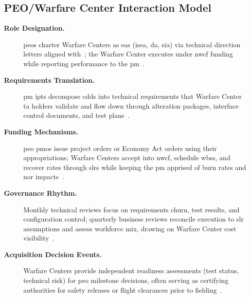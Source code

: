 \documentclass[../main.tex]{subfiles}
\begin{document}
\begin{refsegment}
\subsection{PEO/Warfare Center Interaction Model}
\begin{description}
	\item[\textbf{Role Designation.}] \acp{peo} charter Warfare Centers as \acp{ea} (\ac{isea}, \ac{da}, \ac{sia}) via technical direction letters aligned with~\autocite{SECNAV5400-15D}; the Warfare Center executes under \ac{nwcf} funding while reporting performance to the \ac{pm}~\autocite{edo-2-1-4-warfare-centers-2024}.
	\item[\textbf{Requirements Translation.}] \ac{pm} \acp{ipt} decompose \acp{cdd} into technical requirements that Warfare Center \ac{ta} holders validate and flow down through alteration packages, interface control documents, and test plans~\autocite{edo-2-1-4-warfare-centers-2024}.
	\item[\textbf{Funding Mechanisms.}] \ac{peo} \acp{pmo} issue project orders or Economy Act orders using their appropriations; Warfare Centers accept into \ac{nwcf}, schedule \acp{wbs}, and recover rates through \acp{slr} while keeping the \ac{pm} apprised of burn rates and \ac{nor} impacts~\autocite{edo-3-1-5-field-activity-fm-2025}.
	\item[\textbf{Governance Rhythm.}] Monthly technical reviews focus on requirements churn, test results, and configuration control; quarterly business reviews reconcile execution to \ac{slr} assumptions and assess workforce mix, drawing on Warfare Center cost visibility~\autocite{SECNAV5400-15D,edo-3-1-5-field-activity-fm-2025}.
	\item[\textbf{Acquisition Decision Events.}] Warfare Centers provide independent readiness assessments (test status, technical risk) for \ac{peo} milestone decisions, often serving as certifying authorities for safety releases or flight clearances prior to fielding~\autocite{SECNAV5400-15D,edo-2-1-4-warfare-centers-2024}.
\end{description}
\end{refsegment}
\end{document}
